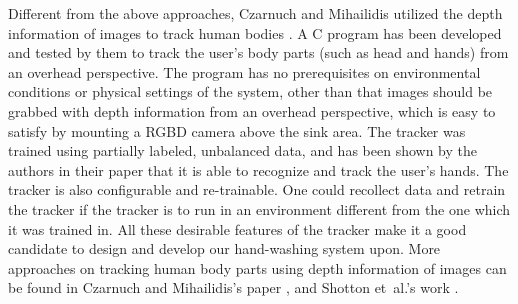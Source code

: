 Different from the above approaches, Czarnuch and Mihailidis utilized the depth information of images to track human bodies \cite{czarnuch2014}. A C program has been developed and tested by them to track the user's body parts (such as head and hands) from an overhead perspective. The program has no prerequisites on environmental conditions or physical settings of the system, other than that images should be grabbed with depth information from an overhead perspective, which is easy to satisfy by mounting a RGBD camera above the sink area. The tracker was trained using partially labeled, unbalanced data, and has been shown by the authors in their paper that it is able to recognize and track the user's hands. The tracker is also configurable and re-trainable. One could recollect data and retrain the tracker if the tracker is to run in an environment different from the one which it was trained in. All these desirable features of the tracker make it a good candidate to design and develop our hand-washing system upon. More approaches on tracking human body parts using depth information of images can be found in Czarnuch and Mihailidis's paper \cite{czarnuch2014}, and Shotton et~al.'s work \cite{shotton2013real}.

